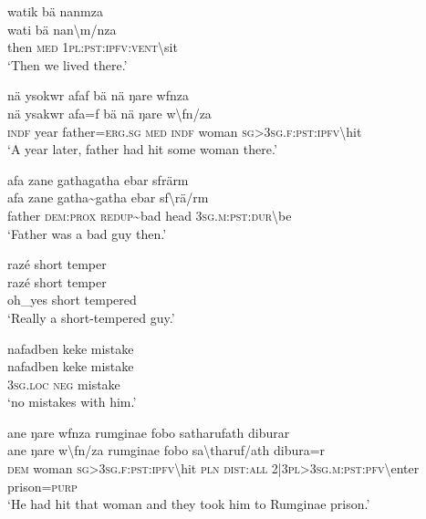 \ea\label{ex:14:a3198}
watik bä nanmza\\
\gll wati	bä	nan{\textbackslash}m/nza\\
     then	\textsc{med}	1\textsc{pl}:\textsc{pst}:\textsc{ipfv}:\textsc{vent}{\textbackslash}sit\\
\glt `Then we lived there.'
\z

\ea\label{ex:14:a3199}
nä ysokwr afaf bä nä ŋare wfnza\\
\gll nä	ysakwr	afa=f	bä	nä	ŋare	w{\textbackslash}fn/za\\
     \textsc{indf}	year	father=\textsc{erg}.\textsc{sg}	\textsc{med}	\textsc{indf}	woman	\textsc{sg}>3\textsc{sg}.\textsc{f}:\textsc{pst}:\textsc{ipfv}{\textbackslash}hit\\
\glt `A year later, father had hit some woman there.'
\z

\ea\label{ex:14:a3201}
afa zane gathagatha ebar sfrärm\\
\gll afa	zane	gatha{\textasciitilde}gatha	ebar	sf{\textbackslash}rä/rm\\
     father	\textsc{dem}:\textsc{prox}	\textsc{redup}{\textasciitilde}bad	head	3\textsc{sg}.\textsc{m}:\textsc{pst}:\textsc{dur}{\textbackslash}be\\
\glt `Father was a bad guy then.'
\z

\ea\label{ex:14:a3202}
razé short temper\\
\gll razé	short	temper\\
     oh\_yes	short	tempered\\
\glt `Really a short-tempered guy.'
\z

\ea\label{ex:14:a3203}
nafadben keke mistake\\
\gll nafadben	keke	mistake\\
     3\textsc{sg}.\textsc{loc}	\textsc{neg}	mistake\\
\glt `no mistakes with him.'
\z

\ea\label{ex:14:a3204}
ane ŋare wfnza rumginae fobo satharufath diburar\\
\gll ane	ŋare	w{\textbackslash}fn/za	rumginae	fobo	sa{\textbackslash}tharuf/ath	dibura=r\\
     \textsc{dem}	woman	\textsc{sg}>3\textsc{sg}.\textsc{f}:\textsc{pst}:\textsc{ipfv}{\textbackslash}hit	\textsc{pln}	\textsc{dist}:\textsc{all}	2|3\textsc{pl}>3\textsc{sg}.\textsc{m}:\textsc{pst}:\textsc{pfv}{\textbackslash}enter	prison=\textsc{purp}\\
\glt `He had hit that woman and they took him to Rumginae prison.'
\z

